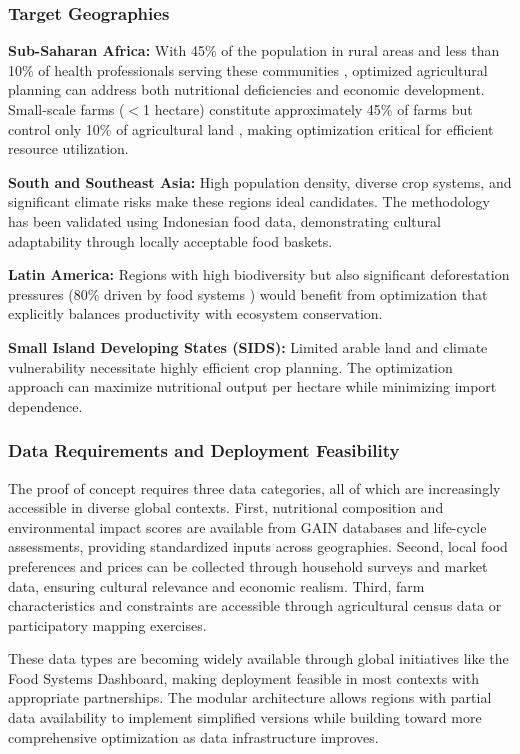 \documentclass{oqireport}
\begin{document}
\subsubsection{Target Geographies}

\textbf{Sub-Saharan Africa:} With 45\% of the population in rural areas and less than 10\% of health professionals serving these communities \cite{Fanzo2022}, optimized agricultural planning can address both nutritional deficiencies and economic development. Small-scale farms ($<$1 hectare) constitute approximately 45\% of farms but control only 10\% of agricultural land \cite{LOWDER201616}, making optimization critical for efficient resource utilization.

\textbf{South and Southeast Asia:} High population density, diverse crop systems, and significant climate risks make these regions ideal candidates. The methodology has been validated using Indonesian food data, demonstrating cultural adaptability through locally acceptable food baskets.

\textbf{Latin America:} Regions with high biodiversity but also significant deforestation pressures (80\% driven by food systems \cite{Fanzo2022}) would benefit from optimization that explicitly balances productivity with ecosystem conservation.

\textbf{Small Island Developing States (SIDS):} Limited arable land and climate vulnerability necessitate highly efficient crop planning. The optimization approach can maximize nutritional output per hectare while minimizing import dependence.

\subsubsection{Data Requirements and Deployment Feasibility}

The proof of concept requires three data categories, all of which are increasingly accessible in diverse global contexts. First, nutritional composition and environmental impact scores are available from GAIN databases and life-cycle assessments, providing standardized inputs across geographies. Second, local food preferences and prices can be collected through household surveys and market data, ensuring cultural relevance and economic realism. Third, farm characteristics and constraints are accessible through agricultural census data or participatory mapping exercises.

These data types are becoming widely available through global initiatives like the Food Systems Dashboard, making deployment feasible in most contexts with appropriate partnerships. The modular architecture allows regions with partial data availability to implement simplified versions while building toward more comprehensive optimization as data infrastructure improves.
\end{document}
